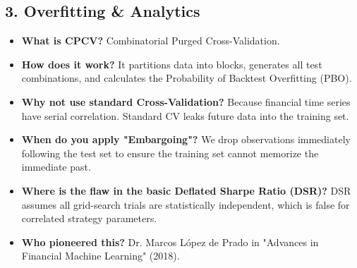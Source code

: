 \documentclass[12pt,a4paper]{article}
\begin{document}
\subsection{3. Overfitting \& Analytics}
\begin{itemize}
    \item \textbf{What is CPCV?} Combinatorial Purged Cross-Validation.
    \item \textbf{How does it work?} It partitions data into blocks, generates all test combinations, and calculates the Probability of Backtest Overfitting (PBO).
    \item \textbf{Why not use standard Cross-Validation?} Because financial time series have serial correlation. Standard CV leaks future data into the training set.
    \item \textbf{When do you apply "Embargoing"?} We drop observations immediately following the test set to ensure the training set cannot memorize the immediate past.
    \item \textbf{Where is the flaw in the basic Deflated Sharpe Ratio (DSR)?} DSR assumes all grid-search trials are statistically independent, which is false for correlated strategy parameters.
    \item \textbf{Who pioneered this?} Dr. Marcos López de Prado in "Advances in Financial Machine Learning" (2018).
\end{itemize}
\end{document}
